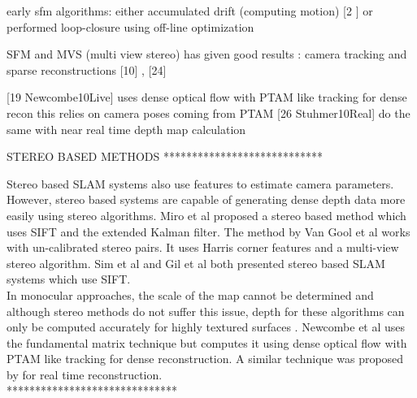 early sfm algorithms: either accumulated drift (computing motion) [2 \cite{Beardsley97Sequential} ] or performed loop-closure using off-line optimization 

SFM and MVS (multi view stereo) has given good results : camera tracking  and sparse reconstructions [10] \cite{Fitzgibbon98Automatic}, \cite{Seitz06Comparison} [24] 


[19 Newcombe10Live] uses dense optical flow with PTAM like tracking for dense recon
this relies on camera poses coming from PTAM
[26  Stuhmer10Real] do the same with near real time depth map calculation


STEREO BASED METHODS
****************************

Stereo based SLAM systems also use features to estimate camera parameters. However, stereo based systems are capable of generating dense depth data more easily using stereo algorithms. Miro et al \cite{Miro06Towards} proposed a stereo based method which uses SIFT and the extended Kalman filter. The method by Van Gool et al \cite{Pollefeys04Visual} works with un-calibrated stereo pairs. It uses Harris corner features and a multi-view stereo algorithm. Sim et al \cite{Sim05Vision} and Gil et al \cite{Gil06Improving} both presented stereo based SLAM systems which use SIFT. \\

In monocular approaches, the scale of the map cannot be determined and although stereo methods \cite{Konolige08Outdoor, Paz08Large} do not suffer this issue, depth for these algorithms can only be computed accurately for highly textured surfaces \cite{Endres12Evaluation}.  Newcombe et al \cite{Newcombe10Live} uses the fundamental matrix technique but computes it using dense optical flow with PTAM like tracking for dense reconstruction. A similar technique was proposed by \cite{Stuhmer10Real} for real time reconstruction. \\

******************************
